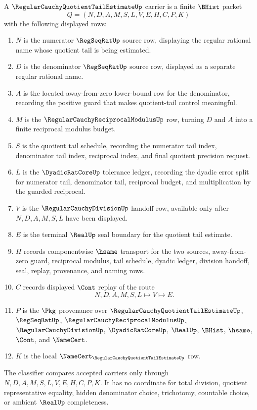 \begin{definition}
\label{def:regular-cauchy-quotient-tail-estimate-carrier}
A $\RegularCauchyQuotientTailEstimateUp$ carrier is a finite $\BHist$ packet
$$
Q=(N,D,A,M,S,L,V,E,H,C,P,K)
$$
with the following displayed rows:
\begin{enumerate}
\item $N$ is the numerator $\RegSeqRatUp$ source row, displaying the regular rational name whose quotient tail is being estimated.
\item $D$ is the denominator $\RegSeqRatUp$ source row, displayed as a separate regular rational name.
\item $A$ is the located away-from-zero lower-bound row for the denominator, recording the positive guard that makes quotient-tail control meaningful.
\item $M$ is the $\RegularCauchyReciprocalModulusUp$ row, turning $D$ and $A$ into a finite reciprocal modulus budget.
\item $S$ is the quotient tail schedule, recording the numerator tail index, denominator tail index, reciprocal index, and final quotient precision request.
\item $L$ is the $\DyadicRatCoreUp$ tolerance ledger, recording the dyadic error split for numerator tail, denominator tail, reciprocal budget, and multiplication by the guarded reciprocal.
\item $V$ is the $\RegularCauchyDivisionUp$ handoff row, available only after $N,D,A,M,S,L$ have been displayed.
\item $E$ is the terminal $\RealUp$ seal boundary for the quotient tail estimate.
\item $H$ records componentwise $\hsame$ transport for the two sources, away-from-zero guard, reciprocal modulus, tail schedule, dyadic ledger, division handoff, seal, replay, provenance, and naming rows.
\item $C$ records displayed $\Cont$ replay of the route
$$
N,D,A,M,S,L \longmapsto V \longmapsto E .
$$
\item $P$ is the $\Pkg$ provenance over $\RegularCauchyQuotientTailEstimateUp$, $\RegSeqRatUp$, $\RegularCauchyReciprocalModulusUp$, $\RegularCauchyDivisionUp$, $\DyadicRatCoreUp$, $\RealUp$, $\BHist$, $\hsame$, $\Cont$, and $\NameCert$.
\item $K$ is the local $\NameCert_{\RegularCauchyQuotientTailEstimateUp}$ row.
\end{enumerate}
The classifier compares accepted carriers only through $N,D,A,M,S,L,V,E,H,C,P,K$. It has no coordinate for total division, quotient representative equality, hidden denominator choice, trichotomy, countable choice, or ambient $\RealUp$ completeness.
\end{definition}

